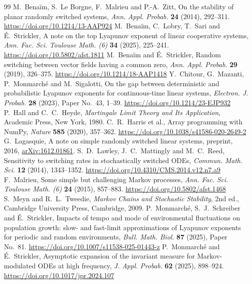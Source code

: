 \documentclass[11pt]{amsart}
\begin{document}
\begin{thebibliography}{99}
 M.~Bena\"im, S.~Le Borgne, F.~Malrieu and P.-A.~Zitt, On the stability of planar randomly switched
systems, \emph{Ann. Appl. Probab.} \textbf{24} (2014), 292--311.
\url{https://doi.org/10.1214/13-AAP924}
 M.~Bena\"im, C.~Lobry, T.~Sari and \'E.~Strickler, A note on the top Lyapunov exponent of linear
cooperative systems, \emph{Ann. Fac. Sci. Toulouse Math. (6)} \textbf{34} (2025), 225--241.
\url{https://doi.org/10.5802/afst.1811}
 M.~Bena\"im and \'E.~Strickler, Random switching between vector fields having a common zero, \emph{Ann.
Appl. Probab.} \textbf{29} (2019), 326--375.
\url{https://doi.org/10.1214/18-AAP1418}
 Y.~Chitour, G.~Mazanti, P.~Monmarch\'e and M.~Sigalotti, On the gap between deterministic and
probabilistic Lyapunov exponents for continuous-time linear systems, \emph{Electron. J. Probab.} \textbf{28} (2023),
Paper No.~43, 1--39.
\url{https://doi.org/10.1214/23-EJP932}
 P.~Hall and C.~C.~Heyde, \emph{Martingale Limit Theory and Its Application}, Academic Press, New York,
1980.
 C.~R.~Harris et al., Array programming with NumPy, \emph{Nature} \textbf{585} (2020), 357--362.
\url{https://doi.org/10.1038/s41586-020-2649-2}
 G.~Lagasquie, A note on simple randomly switched linear systems, preprint, 2016,
\href{https://arxiv.org/abs/1612.01861}{arXiv:1612.01861}.
 S.~D.~Lawley, J.~C.~Mattingly and M.~C.~Reed, Sensitivity to switching rates in stochastically switched
ODEs, \emph{Commun. Math. Sci.} \textbf{12} (2014), 1343--1352.
\url{https://doi.org/10.4310/CMS.2014.v12.n7.a9}
 F.~Malrieu, Some simple but challenging Markov processes, \emph{Ann. Fac. Sci. Toulouse Math. (6)}
\textbf{24} (2015), 857--883.
\url{https://doi.org/10.5802/afst.1468}
 S.~Meyn and R.~L.~Tweedie, \emph{Markov Chains and Stochastic Stability}, 2nd ed., Cambridge University
Press, Cambridge, 2009.
 P.~Monmarch\'e, S.~J.~Schreiber and \'E.~Strickler, Impacts of tempo and mode of environmental
fluctuations on population growth: slow- and fast-limit approximations of Lyapunov exponents for periodic and random
environments, \emph{Bull. Math. Biol.} \textbf{87} (2025), Paper No.~81.
\url{https://doi.org/10.1007/s11538-025-01443-z}
 P.~Monmarch\'e and \'E.~Strickler, Asymptotic expansion of the invariant measure for Markov-modulated ODEs
at high frequency, \emph{J. Appl. Probab.} \textbf{62} (2025), 898--924.
\url{https://doi.org/10.1017/jpr.2024.107}

\end{thebibliography}
\end{document}
